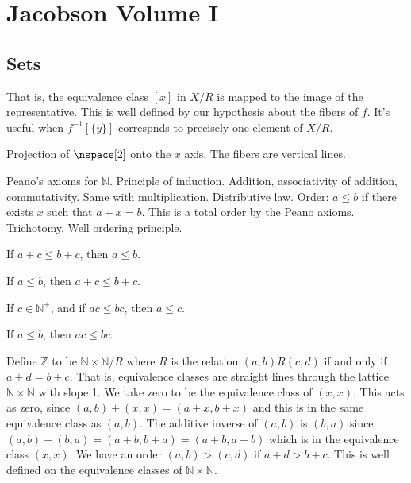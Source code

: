 \section{Jacobson Volume I}
    \subsection{Sets}
        That is, the equivalence class $[x]$ in $X/R$ is mapped to the image of
        the representative. This is well defined by our hypothesis about the
        fibers of $f$. It's useful when $f^{\minus{1}}[\{y\}]$ correspnds to
        precisely one element of $X/R$.
        \begin{example}
            Projection of $\nspace[2]$ onto the $x$ axis. The fibers are
            vertical lines.
        \end{example}
        Peano's axioms for $\mathbb{N}$. Principle of induction. Addition,
        associativity of addition, commutativity. Same with multiplication.
        Distributive law. Order: $a\leq{b}$ if there exists $x$ such that
        $a+x=b$. This is a total order by the Peano axioms. Trichotomy.
        Well ordering principle.
        \begin{theorem}
            If $a+c\leq{b}+c$, then $a\leq{b}$.
        \end{theorem}
        \begin{theorem}
            If $a\leq{b}$, then $a+c\leq{b}+c$.
        \end{theorem}
        \begin{theorem}
            If $c\in\mathbb{N}^{+}$, and if $ac\leq{b}c$, then $a\leq{c}$.
        \end{theorem}
        \begin{theorem}
            If $a\leq{b}$, then $ac\leq{b}c$.
        \end{theorem}
        Define $\mathbb{Z}$ to be $\mathbb{N}\times\mathbb{N}/R$ where $R$
        is the relation $(a,b)R(c,d)$ if and only if $a+d=b+c$. That is,
        equivalence classes are straight lines through the lattice
        $\mathbb{N}\times\mathbb{N}$ with slope 1. We take zero to be the
        equivalence class of $(x,x)$. This acts as zero, since
        $(a,b)+(x,x)=(a+x,b+x)$ and this is in the same equivalence class as
        $(a,b)$. The additive inverse of $(a,b)$ is $(b,a)$ since
        $(a,b)+(b,a)=(a+b,b+a)=(a+b,a+b)$ which is in the equivalence class
        $(x,x)$. We have an order $(a,b)>(c,d)$ if $a+d>b+c$. This is well
        defined on the equivalence classes of $\mathbb{N}\times\mathbb{N}$.
